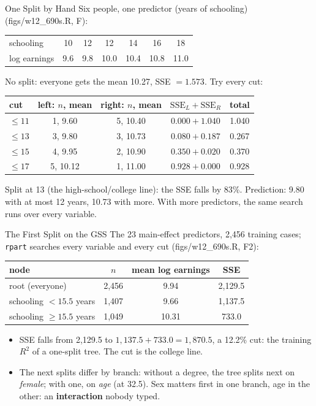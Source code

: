 \documentclass[aspectratio=169,11pt,xcolor=dvipsnames]{beamer}
\newcommand{\srcp}[1]{{\scriptsize\color{gray}(#1)}}
\begin{document}
\begin{frame}{One Split by Hand}
Six people, one predictor (years of schooling) \srcp{figs/w12\_690s.R, F}:
\begin{center}\small
\begin{tabular}{@{}lcccccc@{}}
\toprule
schooling & 10 & 12 & 12 & 14 & 16 & 18 \\
log earnings & 9.6 & 9.8 & 10.0 & 10.4 & 10.8 & 11.0 \\
\bottomrule
\end{tabular}
\end{center}
\vskip2pt
No split: everyone gets the mean 10.27, SSE $= 1.573$. Try every cut:
\begin{center}\small
\renewcommand{\arraystretch}{1.1}
\begin{tabular}{@{}lcccc@{}}
\toprule
cut & left: $n$, mean & right: $n$, mean & $\text{SSE}_L + \text{SSE}_R$ & total \\
\midrule
$\leq 11$ & 1, 9.60 & 5, 10.40 & $0.000 + 1.040$ & 1.040 \\
$\leq 13$ & 3, 9.80 & 3, 10.73 & $0.080 + 0.187$ & \alert{0.267} \\
$\leq 15$ & 4, 9.95 & 2, 10.90 & $0.350 + 0.020$ & 0.370 \\
$\leq 17$ & 5, 10.12 & 1, 11.00 & $0.928 + 0.000$ & 0.928 \\
\bottomrule
\end{tabular}
\end{center}
\vskip2pt
{\small Split at 13 (the high-school/college line): the SSE falls by 83\%. Prediction: 9.80
with at most 12 years, 10.73 with more. With more predictors, the same search runs over every variable.}
\end{frame}

\begin{frame}{The First Split on the GSS}
The 23 main-effect predictors, 2,456 training cases; \texttt{rpart} searches every
variable and every cut \srcp{figs/w12\_690s.R, F2}:
\begin{center}\small
\renewcommand{\arraystretch}{1.1}
\begin{tabular}{@{}lccc@{}}
\toprule
node & $n$ & mean log earnings & SSE \\
\midrule
root (everyone) & 2,456 & 9.94 & 2,129.5 \\
schooling $< 15.5$ years & 1,407 & 9.66 & 1,137.5 \\
schooling $\geq 15.5$ years & 1,049 & 10.31 & 733.0 \\
\bottomrule
\end{tabular}
\end{center}
\begin{itemize}\itemsep3pt\small
  \item SSE falls from 2,129.5 to $1{,}137.5 + 733.0 = 1{,}870.5$, a 12.2\% cut: the
        training $R^2$ of a one-split tree. The cut is the college line.
  \item The next splits differ by branch: without a degree, the tree splits next on
        \emph{female}; with one, on \emph{age} (at 32.5). Sex matters first in one branch,
        age in the other: an \textbf{interaction} nobody typed.
\end{itemize}
\end{frame}
\end{document}
